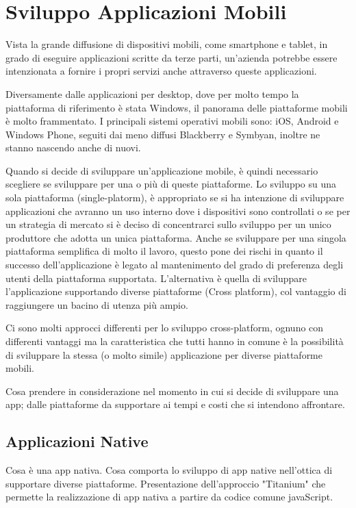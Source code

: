 \chapter{Sviluppo Applicazioni Mobili}
	Vista la grande diffusione di dispositivi mobili, come smartphone e tablet, in grado di eseguire applicazioni scritte da terze parti, un'azienda potrebbe essere intenzionata a fornire i propri servizi anche attraverso queste applicazioni.
	
	Diversamente dalle applicazioni per desktop, dove per molto tempo la piattaforma di riferimento è stata Windows, il panorama delle piattaforme mobili è molto frammentato.
	I principali sistemi operativi mobili sono: iOS, Android e Windows Phone, seguiti dai meno diffusi Blackberry e Symbyan, inoltre ne stanno nascendo anche di nuovi.
	
	Quando si decide di sviluppare un'applicazione mobile, è quindi necessario scegliere se sviluppare per una o più di queste piattaforme.
	Lo sviluppo su una sola piattaforma (single-platorm), è appropriato se si ha intenzione di sviluppare applicazioni che avranno un uso interno dove i dispositivi sono controllati o se per un strategia di mercato si è deciso di concentrarci sullo sviluppo per un unico produttore che adotta un unica piattaforma.
	Anche se sviluppare per una singola piattaforma semplifica di molto il lavoro, questo pone dei rischi in quanto il successo dell'applicazione è legato al mantenimento del grado di preferenza degli utenti della piattaforma supportata.
	L'alternativa è quella di sviluppare l'applicazione supportando diverse piattaforme (Cross platform), col vantaggio di raggiungere un bacino di utenza più ampio.
	
	Ci sono molti approcci differenti per lo sviluppo cross-platform, ognuno con differenti vantaggi ma la caratteristica che tutti hanno in comune è la possibilità di sviluppare la stessa (o molto simile) applicazione per diverse piattaforme mobili.
	 
	Cosa prendere in considerazione nel momento in cui si decide di sviluppare
	una app; dalle piattaforme da supportare ai tempi e costi che si intendono
	affrontare.
	
	\section{Applicazioni Native}
		Cosa è una app nativa. Cosa comporta lo sviluppo di app native
		nell'ottica di supportare diverse piattaforme. Presentazione
		dell'approccio "Titanium" che permette la realizzazione di app nativa a
		partire da codice comune javaScript.
		
